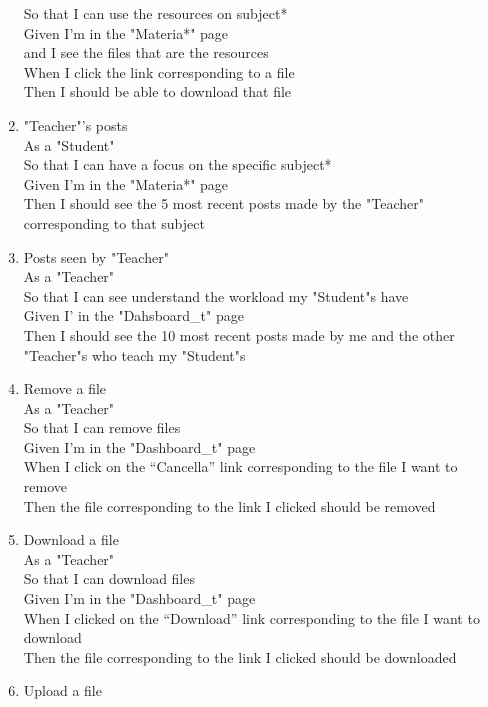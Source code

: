 \documentclass[Lau, binding=0.6cm]{sapthesis}
\begin{document}
\begin{enumerate}
			So that I can use the resources on subject*\\
			Given I’m in the "Materia*" page\\
			and I see the files that are the resources\\
			When I click the link corresponding to a file\\
			Then I should be able to download that file\\
	\item "Teacher"’s posts\\
			As a "Student"\\
			So that I can have a focus on the specific subject*\\
			Given I’m in the "Materia*" page\\
			Then I should see the 5 most recent posts made by the "Teacher" corresponding to that subject\\
	\item Posts seen by "Teacher"\\
			As a "Teacher"\\
			So that I can see understand the workload my "Student"s have\\
			Given I’ in the "Dahsboard\_t" page\\
			Then I should see the 10 most recent posts made by me and the other "Teacher"s who teach my "Student"s\\
	\item Remove a file\\
			As a "Teacher"\\
			So that I can remove files\\
			Given I’m in the "Dashboard\_t" page\\
			When I click on the “Cancella” link corresponding to the file I want to remove\\
			Then the file corresponding to the link I clicked should be removed\\
	\item Download a file\\
			As a "Teacher"\\
			So that I can download files\\
			Given I’m in the "Dashboard\_t" page\\
			When I clicked on the “Download” link corresponding to the file I want to download\\
			Then the file corresponding to the link I clicked should be downloaded\\
	\item Upload a file\\

\end{enumerate}
\end{document}
